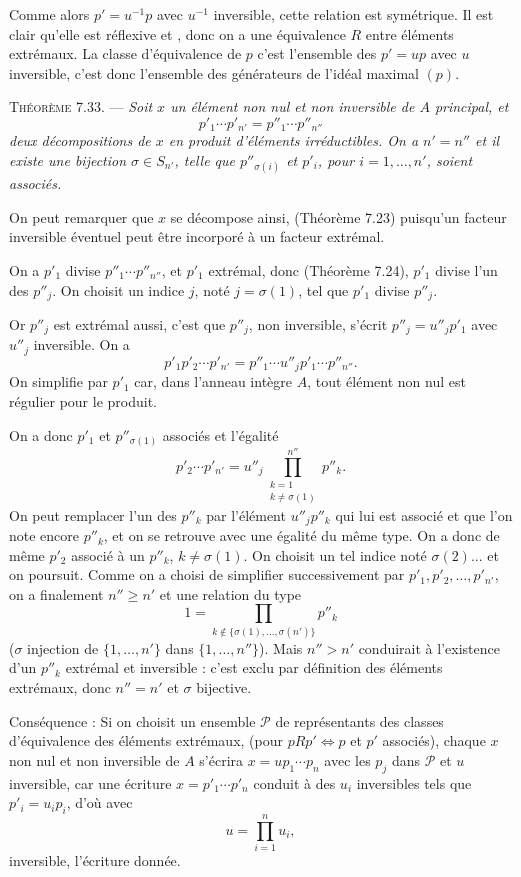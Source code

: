 Comme alors $p'=u^{-1}p$ avec $u^{-1}$ inversible, cette relation est symétrique. Il est clair qu'elle est réflexive et , donc on a une équivalence $R$ entre éléments extrémaux. La classe d'équivalence de $p$ c'est l'ensemble des $p'=up$ avec $u$ inversible, c'est donc l'ensemble des générateurs de l'idéal maximal $(p)$.

\medskip\noindent\textsc{Théorème 7.33.} --- \emph{Soit $x$ un élément non nul et non inversible de $A$ principal, et
\[
p'_1\cdots p'_{n'}=p''_1\cdots p''_{n''}
\]
deux décompositions de $x$ en produit d'éléments irréductibles. On a $n'=n''$ et il existe une bijection $\sigma\in S_{n'}$, telle que $p''_{\sigma(i)}$ et $p'_i$, pour $i=1,\ldots,n'$, soient associés.}

On peut remarquer que $x$ se décompose ainsi, (Théorème 7.23) puisqu'un facteur inversible éventuel peut être incorporé à un facteur extrémal.

On a $p'_1$ divise $p''_1\cdots p''_{n''}$, et $p'_1$ extrémal, donc (Théorème 7.24), $p'_1$ divise l'un des $p''_j$. On choisit un indice $j$, noté $j=\sigma(1)$, tel que $p'_1$ divise $p''_j$.

Or $p''_j$ est extrémal aussi, c'est que $p''_j$, non inversible, s'écrit $p''_j=u''_jp'_1$ avec $u''_j$ inversible. On a
\[
p'_1p'_2\cdots p'_{n'}=p''_1\cdots u''_jp'_1\cdots p''_{n''}.
\]
On simplifie par $p'_1$ car, dans l'anneau intègre $A$, tout élément non nul est régulier pour le produit.

On a donc $p'_1$ et $p''_{\sigma(1)}$ associés et l'égalité
\[
p'_2\cdots p'_{n'}=u''_j\prod_{\substack{k=1\\k\ne\sigma(1)}}^{n''}p''_k.
\]
On peut remplacer l'un des $p''_k$ par l'élément $u''_jp''_k$ qui lui est associé et que l'on note encore $p''_k$, et on se retrouve avec une égalité du même type. On a donc de même $p'_2$ associé à un $p''_k$, $k\ne\sigma(1)$. On choisit un tel indice noté $\sigma(2)$... et on poursuit. Comme on a choisi de simplifier successivement par $p'_1,p'_2,\ldots,p'_{n'}$, on a finalement $n''\ge n'$ et une relation du type
\[
1=\prod_{k\notin\{\sigma(1),\ldots,\sigma(n')\}}p''_k
\]
($\sigma$ injection de $\{1,\ldots,n'\}$ dans $\{1,\ldots,n''\}$). Mais $n''>n'$ conduirait à l'existence d'un $p''_k$ extrémal et inversible : c'est exclu par définition des éléments extrémaux, donc $n''=n'$ et $\sigma$ bijective. \bookend

Conséquence : Si on choisit un ensemble $\mathcal P$ de représentants des classes d'équivalence des éléments extrémaux, (pour $pRp'\Longleftrightarrow p$ et $p'$ associés), chaque $x$ non nul et non inversible de $A$ s'écrira $x=up_1\cdots p_n$ avec les $p_j$ dans $\mathcal P$ et $u$ inversible, car une écriture $x=p'_1\cdots p'_n$ conduit à des $u_i$ inversibles tels que $p'_i=u_ip_i$, d'où avec
\[
u=\prod_{i=1}^n u_i,
\]
inversible, l'écriture donnée.

